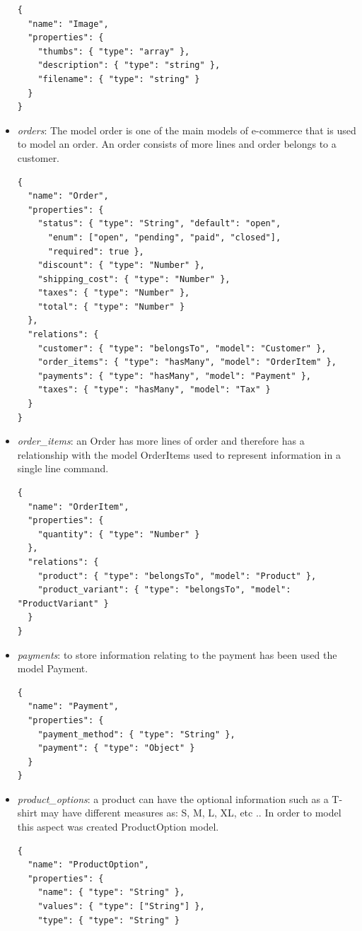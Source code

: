 \begin{itemize}
\begin{lstlisting}
{
  "name": "Image",
  "properties": {
    "thumbs": { "type": "array" },
    "description": { "type": "string" },
    "filename": { "type": "string" }
  }
}
\end{lstlisting}
\item \emph{orders}: The model order is one of the main models of e-commerce that is used to model an order. An order consists of more lines and order belongs to a customer.
\begin{lstlisting}
{
  "name": "Order",
  "properties": {
    "status": { "type": "String", "default": "open",
      "enum": ["open", "pending", "paid", "closed"],
      "required": true },
    "discount": { "type": "Number" },
    "shipping_cost": { "type": "Number" },
    "taxes": { "type": "Number" },
    "total": { "type": "Number" }
  },
  "relations": {
    "customer": { "type": "belongsTo", "model": "Customer" },
    "order_items": { "type": "hasMany", "model": "OrderItem" },
    "payments": { "type": "hasMany", "model": "Payment" },
    "taxes": { "type": "hasMany", "model": "Tax" }
  }
}
\end{lstlisting}
\item \emph{order\_items}: an Order has more lines of order and therefore has a relationship with the model OrderItems used to represent information in a single line command.
\begin{lstlisting}
{
  "name": "OrderItem",
  "properties": {
    "quantity": { "type": "Number" }
  },
  "relations": {
    "product": { "type": "belongsTo", "model": "Product" },
    "product_variant": { "type": "belongsTo", "model": "ProductVariant" }
  }
}
\end{lstlisting}
\item \emph{payments}: to store information relating to the payment has been used the model Payment.
\begin{lstlisting}
{
  "name": "Payment",
  "properties": {
    "payment_method": { "type": "String" },
    "payment": { "type": "Object" }
  }
}
\end{lstlisting}
\item \emph{product\_options}: a product can have the optional information such as a T-shirt may have different measures as: S, M, L, XL, etc .. In order to model this aspect was created ProductOption model.
\begin{lstlisting}
{
  "name": "ProductOption",
  "properties": {
    "name": { "type": "String" },
    "values": { "type": ["String"] },
    "type": { "type": "String" }

\end{lstlisting}
\end{itemize}
